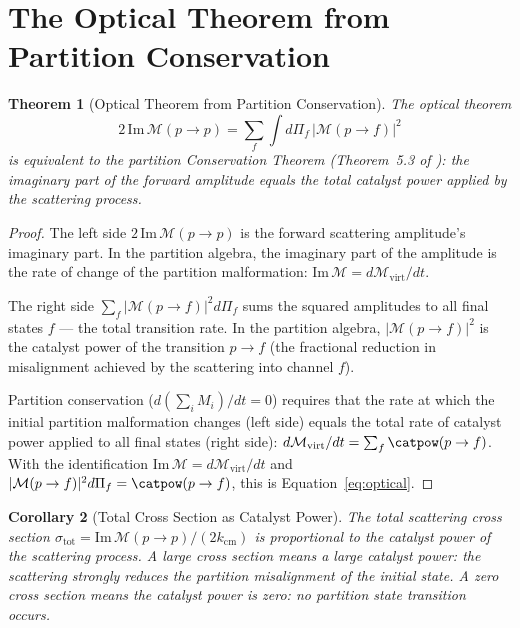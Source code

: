 \documentclass[twocolumn,10pt,a4paper]{article}
\theoremstyle{thmstyle}
\newtheorem{theorem}{Theorem}[section]
\newtheorem{corollary}[theorem]{Corollary}
\theoremstyle{definition}
\theoremstyle{remark}
\newcommand{\Mop}{\mathcal{M}}
\begin{document}
\section{The Optical Theorem from Partition Conservation}
\label{sec:optical}

\begin{theorem}[Optical Theorem from Partition Conservation]
\label{thm:optical}
The optical theorem
\begin{equation}
2\,\mathrm{Im}\,\mathcal{M}(p \to p) = \sum_f\int d\Pi_f\,|\mathcal{M}(p\to f)|^2
\label{eq:optical}
\end{equation}
is equivalent to the partition Conservation Theorem
(Theorem~5.3 of \citealt{companion:spectrometer}): the imaginary part of
the forward amplitude equals the total catalyst power applied by the
scattering process.
\end{theorem}

\begin{proof}
The left side $2\,\mathrm{Im}\,\mathcal{M}(p\to p)$ is the forward
scattering amplitude's imaginary part. In the partition algebra, the
imaginary part of the amplitude is the rate of change of the partition
malformation: $\mathrm{Im}\,\mathcal{M} = d\Mop_{\mathrm{virt}}/dt$.

The right side $\sum_f|\mathcal{M}(p\to f)|^2 d\Pi_f$ sums the squared
amplitudes to all final states $f$ --- the total transition rate. In the
partition algebra, $|\mathcal{M}(p\to f)|^2$ is the catalyst power of the
transition $p\to f$ (the fractional reduction in misalignment achieved
by the scattering into channel $f$).

Partition conservation ($d(\sum_i M_i)/dt = 0$) requires that the rate
at which the initial partition malformation changes (left side) equals
the total rate of catalyst power applied to all final states (right side):
$d\Mop_{\mathrm{virt}}/dt = \sum_f\catpow(p\to f)$.
With the identification $\mathrm{Im}\,\mathcal{M} = d\Mop_{\mathrm{virt}}/dt$
and $|\mathcal{M}(p\to f)|^2 d\Pi_f = \catpow(p\to f)$, this is
Equation~\eqref{eq:optical}.
\end{proof}

\begin{corollary}[Total Cross Section as Catalyst Power]
\label{cor:xsec}
The total scattering cross section
$\sigma_{\mathrm{tot}} = \mathrm{Im}\,\mathcal{M}(p\to p)/(2k_{\mathrm{cm}})$
is proportional to the catalyst power of the scattering process.
A large cross section means a large catalyst power: the scattering
strongly reduces the partition misalignment of the initial state.
A zero cross section means the catalyst power is zero: no partition
state transition occurs.
\end{corollary}
\end{document}
